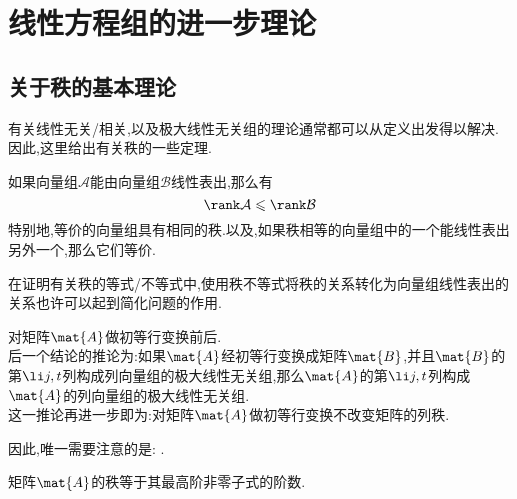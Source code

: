 \documentclass{ctexart}
\begin{document}
\section{线性方程组的进一步理论}
\subsection{关于秩的基本理论}
有关线性无关/相关,以及极大线性无关组的理论通常都可以从定义出发得以解决.因此,这里给出有关秩的一些定理.
\begin{theorem}[秩不等式]
    如果向量组$\mathcal{A}$能由向量组$\mathcal{B}$线性表出,那么有
    \[\rank\mathcal{A}\leqslant\rank\mathcal{B}\]
    特别地,等价的向量组具有相同的秩.以及,如果秩相等的向量组中的一个能线性表出另外一个,那么它们等价.
\end{theorem}
\begin{hint}
    在证明有关秩的等式/不等式中,使用秩不等式将秩的关系转化为向量组线性表出的关系也许可以起到简化问题的作用.
\end{hint}
\begin{theorem}
    对矩阵$\mat{A}$做初等行变换前后.\\
    后一个结论的推论为:如果$\mat{A}$经初等行变换成矩阵$\mat{B}$,并且$\mat{B}$的第$\li j,t$列构成列向量组的极大线性无关组,那么$\mat{A}$的第$\li j,t$列构成$\mat{A}$的列向量组的极大线性无关组.\\
    这一推论再进一步即为:对矩阵$\mat{A}$做初等行变换不改变矩阵的列秩.
\end{theorem}
因此,唯一需要注意的是: .
\begin{theorem}[秩与行列式的关系]
    矩阵$\mat{A}$的秩等于其最高阶非零子式的阶数.
\end{theorem}
\end{document}
